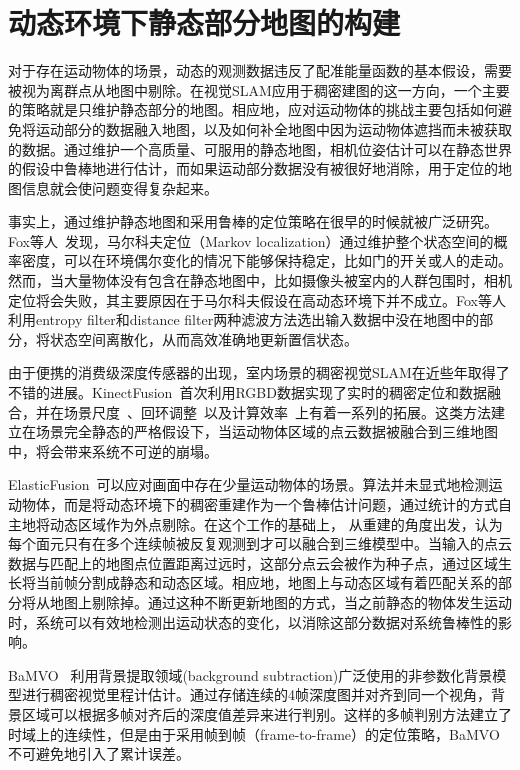 \section{动态环境下静态部分地图的构建}
\label{subsec:object-centered_mapping}
对于存在运动物体的场景，动态的观测数据违反了配准能量函数的基本假设，需要被视为离群点从地图中剔除。在视觉SLAM应用于稠密建图的这一方向，一个主要的策略就是只维护静态部分的地图。相应地，应对运动物体的挑战主要包括如何避免将运动部分的数据融入地图，以及如何补全地图中因为运动物体遮挡而未被获取的数据。通过维护一个高质量、可服用的静态地图，相机位姿估计可以在静态世界的假设中鲁棒地进行估计，而如果运动部分数据没有被很好地消除，用于定位的地图信息就会使问题变得复杂起来。

事实上，通过维护静态地图和采用鲁棒的定位策略在很早的时候就被广泛研究。Fox等人~\cite{fox1999}发现，马尔科夫定位（Markov localization）通过维护整个状态空间的概率密度，可以在环境偶尔变化的情况下能够保持稳定，比如门的开关或人的走动。然而，当大量物体没有包含在静态地图中，比如摄像头被室内的人群包围时，相机定位将会失败，其主要原因在于马尔科夫假设在高动态环境下并不成立。Fox等人利用entropy filter和distance filter两种滤波方法选出输入数据中没在地图中的部分，将状态空间离散化，从而高效准确地更新置信状态。

由于便携的消费级深度传感器的出现，室内场景的稠密视觉SLAM在近些年取得了不错的进展。KinectFusion~\cite{kinectFusion}首次利用RGBD数据实现了实时的稠密定位和数据融合，并在场景尺度~\cite{voxelHashing}、回环调整~\cite{kintinuous}以及计算效率~\cite{CPUmapping}上有着一系列的拓展。这类方法建立在场景完全静态的严格假设下，当运动物体区域的点云数据被融合到三维地图中，将会带来系统不可逆的崩塌。

ElasticFusion~\cite{elasticFusion}可以应对画面中存在少量运动物体的场景。算法并未显式地检测运动物体，而是将动态环境下的稠密重建作为一个鲁棒估计问题，通过统计的方式自主地将动态区域作为外点剔除。在这个工作的基础上，\cite{keller13_3dv} 从重建的角度出发，认为每个面元只有在多个连续帧被反复观测到才可以融合到三维模型中。当输入的点云数据与匹配上的地图点位置距离过远时，这部分点云会被作为种子点，通过区域生长将当前帧分割成静态和动态区域。相应地，地图上与动态区域有着匹配关系的部分将从地图上剔除掉。通过这种不断更新地图的方式，当之前静态的物体发生运动时，系统可以有效地检测出运动状态的变化，以消除这部分数据对系统鲁棒性的影响。

BaMVO~\cite{BaMVO} 利用背景提取领域(background subtraction)广泛使用的非参数化背景模型进行稠密视觉里程计估计。通过存储连续的4帧深度图并对齐到同一个视角，背景区域可以根据多帧对齐后的深度值差异来进行判别。这样的多帧判别方法建立了时域上的连续性，但是由于采用帧到帧（frame-to-frame）的定位策略，BaMVO不可避免地引入了累计误差。

